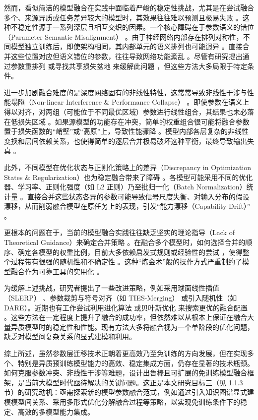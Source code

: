 \documentclass[../main.tex]{subfiles}
\begin{document}
然而，看似简洁的模型融合在实践中面临着严峻的稳定性挑战，尤其是在尝试融合多个、来源异质或任务差异较大的模型时，其效果往往难以预测且极易失败 。这种不稳定性源于一系列深层且相互交织的因素。一个核心障碍在于参数语义的错位（Parameter Semantic Misalignment） 。由于神经网络内部存在排列对称性，不同模型独立训练后，即使架构相同，其内部单元的语义排列也可能迥异 。直接合并这些位置对应但语义错位的参数，往往导致网络功能紊乱 。尽管有研究提出通过参数重排列 或寻找共享损失盆地 来缓解此问题 ，但这些方法大多局限于特定条件。

进一步加剧融合难度的是深度网络固有的非线性特性，这常常导致非线性干涉与性能塌陷（Non-linear Interference \& Performance Collapse） 。即使参数在语义上得以对齐，对两组（可能位于不同最优区域）参数进行线性组合，其结果也未必落在低损失区域 。如果源模型的功能存在冲突，简单的权重组合很可能将融合参数置于损失函数的“峭壁”或“高原”上，导致性能骤降 。模型内部各层复杂的非线性变换和层间依赖关系，也使得简单的逐层合并极易破坏这种平衡，最终导致输出失真 。

此外，不同模型在优化状态与正则化策略上的差异（Discrepancy in Optimization States \& Regularization）也为稳定融合带来了障碍 。各模型可能采用不同的优化器、学习率、正则化强度（如 L2 正则）乃至批归一化（Batch Normalization）统计量 。直接合并这些状态各异的参数可能导致信号尺度失衡、对输入分布的假设漂移，从而削弱融合模型在原任务上的表现，引发“能力漂移（Capability Drift）” 。

更根本的问题在于，当前的模型融合实践往往缺乏坚实的理论指导（Lack of Theoretical Guidance）来确定合并策略 。在融合多个模型时，如何选择合并的顺序、确定各模型的权重比例，目前大多依赖启发式规则或经验性的尝试 ，使得整个过程带有很强的随机性和不确定性 。这种“炼金术”般的操作方式严重制约了模型融合作为可靠工具的实用化 。

为缓解上述挑战，研究者提出了一些改进策略，例如采用球面线性插值（SLERP） 、参数裁剪与符号对齐（如 TIES-Merging） 或引入随机性（如 DARE）。近期也有工作尝试利用进化算法 或贝叶斯优化 来搜索更优的融合配置 。这些方法在一定程度上提升了融合的成功率，但依然难以从根本上保证在融合大量异质模型时的稳定性和性能。现有方法大多将融合视为一个单阶段的优化问题，缺乏对模型间复杂关系的显式建模和利用。

综上所述，虽然参数层迁移技术正朝着更高效乃至免训练的方向发展，但在实现多个、特别是异质预训练模型能力的高效、稳定集成方面，仍存在显著的技术瓶颈。如何克服参数冲突、非线性干涉等难题，设计出鲁棒且可扩展的免训练模型融合框架，是当前大模型时代亟待解决的关键问题。这正是本文研究目标三（见 1.1.3 节）的研究动机：亟需探索新的模型参数融合范式，例如通过引入知识图谱显式建模模型间关系、采用多形式优化分解融合过程等策略，以实现免训练条件下的稳定、高效的多模型能力集成。
\end{document}
